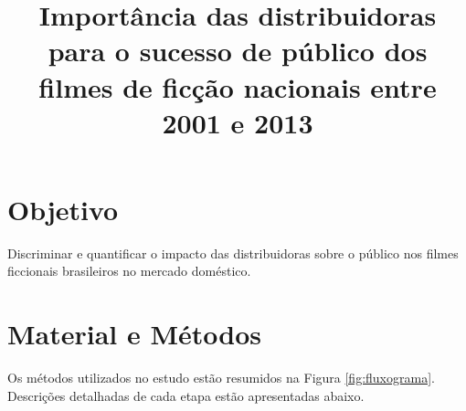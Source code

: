 \documentclass[11pt,a4paper]{article}
\title{Importância das distribuidoras para o sucesso de público dos filmes de ficção nacionais entre 2001 e 2013}
\begin{document}
\maketitle


\section{Objetivo}

Discriminar e quantificar o impacto das distribuidoras sobre o público nos filmes ficcionais brasileiros no mercado doméstico.


\section{Material e Métodos}

Os métodos utilizados no estudo estão resumidos na Figura \ref{fig:fluxograma}. Descrições detalhadas de cada etapa estão apresentadas abaixo.
 
\end{document}
